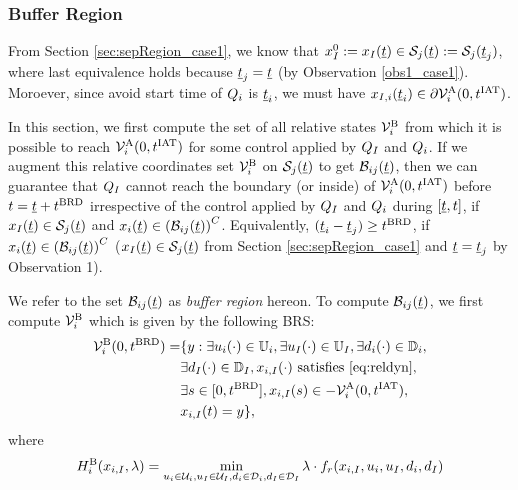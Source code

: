 \subsubsection{Buffer Region} \label{sec:buffRegion_case1}
From Section \ref{sec:sepRegion_case1}, we know that $x_{I}^0 := x_{I}(\underline{t}) \in \mathcal{S}_j(\underline{t}) := \mathcal{S}_j(\underline{t}_j)$, where last equivalence holds because $\underline{t}_j = \underline{t}$ (by Observation \ref{obs1_case1}). Moroever, since avoid start time of $Q_i$ is $\underline{t}_i$, we must have $x_{I, i}(\underline{t}_i) \in \partial \mathcal{V}^{\text{A}}_{i}(0, t^\text{IAT})$.

In this section, we first compute the set of all relative states $\mathcal{V}^{\text{B}}_{i}$ from which it is possible to reach $\mathcal{V}^{\text{A}}_{i}(0, t^\text{IAT})$ for some control applied by $Q_{I}$ and $Q_i$. If we augment this relative coordinates set $\mathcal{V}^{\text{B}}_{i}$ on $\mathcal{S}_j(\underline{t})$ to get $\mathcal{B}_{ij}(\underline{t})$, then we can guarantee that $Q_{I}$ cannot reach the boundary (or inside) of $\mathcal{V}^{\text{A}}_{i}(0, t^\text{IAT})$ before $t = \underline{t} + t^\text{BRD}$ irrespective of the control applied by $Q_{I}$ and $Q_i$ during $[\underline{t}, t]$, if $x_{I}(\underline{t}) \in \mathcal{S}_j(\underline{t})$ and $x_i(\underline{t}) \in \left(\mathcal{B}_{ij}(\underline{t})\right)^C$. Equivalently, $(\underline{t}_i - \underline{t}_j) \geq t^\text{BRD}$, if $x_i(\underline{t}) \in \left(\mathcal{B}_{ij}(\underline{t})\right)^C$ ($x_{I}(\underline{t}) \in \mathcal{S}_j(\underline{t})$ from Section \ref{sec:sepRegion_case1} and $\underline{t} = \underline{t}_j$ by Observation 1).

We refer to the set $\mathcal{B}_{ij}(\underline{t})$ as \textit{buffer region} hereon. To compute $\mathcal{B}_{ij}(\underline{t})$, we first compute $\mathcal{V}^{\text{B}}_{i}$ which is given by the following BRS:
\begin{equation} \label{eqn:buffBRS_case1}
\begin{aligned}
\brs^{\text{B}}_{i}(0, \brd) = & \{y: \exists \ctrl_i(\cdot) \in \cfset_i, \exists \ctrl_\intr(\cdot) \in \cfset_\intr, \exists \dstb_i(\cdot) \in \dfset_i, \\
& \exists \dstb_\intr(\cdot) \in \dfset_\intr, \state_{i, \intr}(\cdot) \text{ satisfies \eqref{eq:reldyn}},\\
& \exists s \in [0, \brd], \state_{i, \intr}(s) \in -\brs^{\text{A}}_{i}(0, \iat),\\
& \state_{i, \intr}(t) = y\},
\end{aligned}
\end{equation}
where 
\begin{equation} 
H^{\text{B}}_{i}(x_{i, I}, \lambda) = \min_{u_i \in \mathcal{U}_i, u_I \in \mathcal{U}_I, d_i \in \mathcal{D}_i, d_I \in \mathcal{D}_I} \lambda \cdot f_r(x_{i, I}, u_i, u_I, d_i, d_I)
\end{equation}

